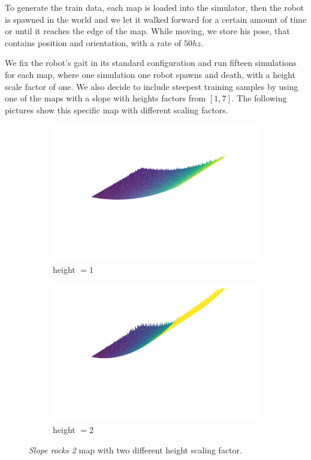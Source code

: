 \documentclass[../document.tex]{subfiles}
\begin{document}
To generate the train data, each map is loaded into the simulator, then the robot is spawned in the world and we let it walked forward for a certain amount of time or until it reaches the edge of the map. While moving, we store his pose, that contains position and orientation, with a rate of $50hz$. 

We fix the robot's gait in its standard configuration and run fifteen simulations for each map, where one simulation one robot spawns and death, with a height scale factor of one. We also decide to include steepest training samples by using one of the maps with a slope with heights factors from $[1,7]$. The following pictures show this specific map with different scaling factors. 

\begin{figure}[H]
    	\begin{subfigure}[b]{0.5\textwidth}
			\includegraphics[width=\textwidth]{img/slope_rocks2-3d.png}
			\caption{height $=1$}
	    \end{subfigure}
		\begin{subfigure}[b]{0.5\textwidth}
			\includegraphics[width=\textwidth]{img/2-slope_rocks2-3d.png}
			\caption{height $=2$}
	    \end{subfigure}	
	   
	\label{fig: heightmaps-heights}
	\caption{\emph{Slope rocks 2} map with two different height scaling factor.}	
\end{figure}
\end{document}
